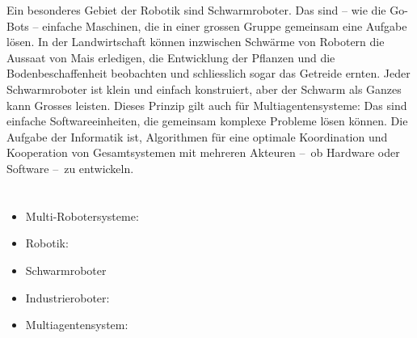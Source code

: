{{Ein besonderes Gebiet der Robotik sind Schwarmroboter. Das sind – wie die Go-Bots – einfache Maschinen, die in einer grossen Gruppe gemeinsam eine Aufgabe lösen. In der Landwirtschaft können inzwischen Schwärme von Robotern die Aussaat von Mais erledigen, die Entwicklung der Pflanzen und die Bodenbeschaffenheit beobachten und schliesslich sogar das Getreide ernten. Jeder Schwarmroboter ist klein und einfach konstruiert, aber der Schwarm als Ganzes kann Grosses leisten. Dieses Prinzip gilt auch für Multiagentensysteme: Das sind einfache Softwareeinheiten, die gemeinsam komplexe Probleme lösen können. Die Aufgabe der Informatik ist, Algorithmen für eine optimale Koordination und Kooperation von Gesamtsystemen mit mehreren Akteuren –~ob Hardware oder Software –~zu entwickeln.



\section*{\BrochureWebsitesAndKeywords}
{\raggedright
\begin{itemize}
  \item Multi-Robotersysteme: \href{https://www.hsu-hh.de/rt/forschung/multirobotersysteme}{}
  \item Robotik: \href{https://www.infineon.com/cms/de/discoveries/grundlagen-robotics/}{}
  \item Schwarmroboter
  \item Industrieroboter: \href{https://de.wikipedia.org/wiki/industrieroboter}{}
  \item Multiagentensystem: \href{https://de.wikipedia.org/wiki/Multiagentensystem}{}
\end{itemize}


}

}{}

\def\AuthorVanicekJ{} %
\def\AuthorMaoY{} %
\def\AuthorKoleszarV{} %
\def\AuthorAhmedA{} %
\def\AuthorWeigendM{} %
\def\AuthorDatzkoThutS{} %

\newpage}{}
